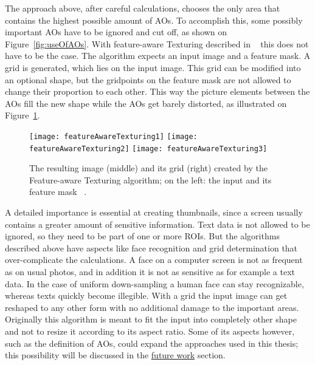 \documentclass[draft,final]{vutinfth} %
\begin{document}
	The approach above, after careful calculations, chooses the only area that contains the highest possible amount of AOs.
	To accomplish this, some possibly important AOs have to be ignored and cut off, as shown on Figure~\ref{fig:useOfAOs}.
	With feature-aware Texturing described in ~\cite{gal2006feature} this does not have to be the case.
	The algorithm expects an input image and a feature mask.
	A grid is generated, which lies on the input image.
	This grid can be modified into an optional shape, but the gridpoints on the feature mask are not allowed to change their proportion to each other.
	This way the picture elements between the AOs fill the new shape while the AOs get barely distorted, as illustrated on Figure~\ref{fig:fat}.\par 
	\begin{figure}[h]
		\texttt{[image: featureAwareTexturing1]}\hfill		
		\texttt{[image: featureAwareTexturing2]}\hfill		
		\texttt{[image: featureAwareTexturing3]}
		\caption{The resulting image (middle) and its grid (right) created  by the Feature-aware Texturing algorithm; on the left: the input and its feature mask ~\cite{gal2006feature}. }
		\label{fig:fat}
	\end{figure}
	A detailed importance is essential at creating thumbnails, since a screen usually contains a greater amount of sensitive information.
	Text data is not allowed to be ignored, so they need to be part of one or more ROIs.
	But the algorithms described above have aspects like face recognition and grid determination that over-complicate the calculations.
	A face on a computer screen is not as frequent as on usual photos, and in addition it is not as sensitive as for example a text data.
	In the case of uniform down-sampling a human face can stay recognizable, whereas texts quickly become illegible. 
	With a grid the input image can get reshaped to any other form with no additional damage to the important areas.
	Originally this algorithm is meant to fit the input into completely other shape and not to resize it according to its aspect ratio.
	Some of its aspects however, such as the definition of AOs, could expand the approaches used in this thesis; this possibility will be discussed in the \hyperref[futureWork]{future work} section.
	
\end{document}
